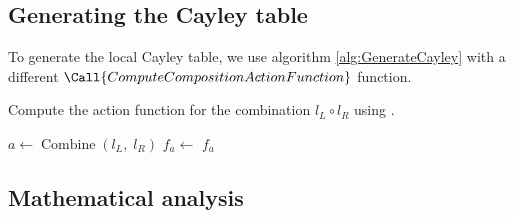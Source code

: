\subsection{Generating the Cayley table}

To generate the local Cayley table, we use algorithm \ref{alg:GenerateCayley} with a different $\Call{ComputeCompositionActionFunction}$ function.

\begin{algorithm}[H]
	\caption{
		Compute the action function for the combination $l_{L} \circ l_{R}$ using .
	}
        \label{alg:ComputeCompositionActionFunction_local}
	\hrulefill
	\begin{algorithmic}[1]
		      \State $a \gets \operatorname{Combine}(l_{L}, \; l_{R})$
                \State $f_{a} \gets$ 
                \State \Return $f_{a}$
		\EndProcedure
	\end{algorithmic}
\end{algorithm}


\subsection{Mathematical analysis}

